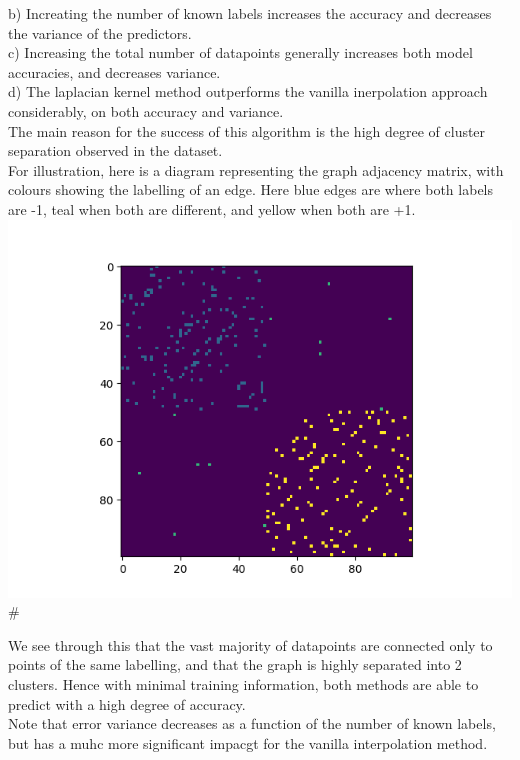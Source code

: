 \documentclass[12pt]{article}
\begin{document}
b) Increating the number of known labels increases the accuracy and decreases
 the variance of the predictors.\\

c) Increasing the total number of datapoints generally increases both model accuracies,
and decreases variance. \\

d) The laplacian kernel method outperforms the vanilla inerpolation approach considerably,
on both accuracy and variance. \\


The main reason for the success of this algorithm is the high degree of
 cluster separation observed in the dataset.
\\

For illustration, here is a diagram representing the graph adjacency matrix,
 with colours showing the labelling of an edge. Here blue edges are where both 
labels are -1, teal when both are different, and yellow when both are +1.\\


\includegraphics{outputs/part2/graph_label_diagram.png}#

We see through this that the vast majority of datapoints are connected only to points
of the same labelling, and that the graph is highly separated  into 2 clusters.
Hence with minimal training information, both methods are able to predict with a
 high degree of accuracy.\\

Note that error variance decreases as a function of the number of known labels, but 
has a muhc more significant impacgt for the vanilla interpolation method.
\end{document}
